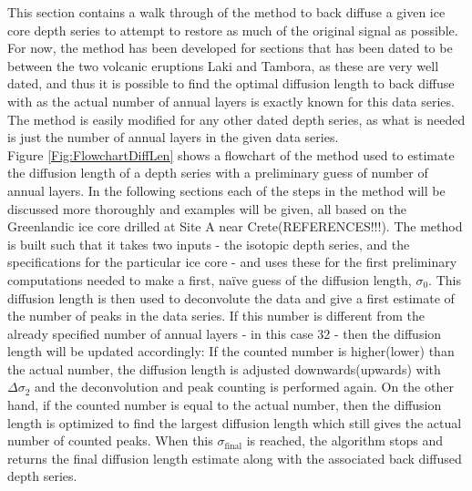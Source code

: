 \documentclass[../../CompleteThesis/Complete_1stDraft.tex]{subfiles}
\begin{document}
This section contains a walk through of the method to back diffuse a given ice core depth series to attempt to restore as much of the original signal as possible. For now, the method has been developed for sections that has been dated to be between the two volcanic eruptions Laki and Tambora, as these are very well dated, and thus it is possible to find the optimal diffusion length to back diffuse with as the actual number of annual layers is exactly known for this data series. The method is easily modified for any other dated depth series, as what is needed is just the number of annual layers in the given data series.\\
Figure \ref{Fig:FlowchartDiffLen} shows a flowchart of the method used to estimate the diffusion length of a depth series with a preliminary guess of number of annual layers. In the following sections each of the steps in the method will be discussed more thoroughly and examples will be given, all based on the Greenlandic ice core drilled at Site A near Crete(REFERENCES!!!).
The method is built such that it takes two inputs - the isotopic depth series, and the specifications for the particular ice core - and uses these for the first preliminary computations needed to make a first, naïve guess of the diffusion length, $\sigma_0$.
This diffusion length is then used to deconvolute the data and give a first estimate of the number of peaks in the data series. If this number is different from the already specified number of annual layers - in this case 32 - then the diffusion length will be updated accordingly: If the counted number is higher(lower) than the actual number, the diffusion length is adjusted downwards(upwards) with $\Delta\sigma_2$ and the deconvolution and peak counting is performed again.
On the other hand, if the counted number is equal to the actual number, then the diffusion length is optimized to find the largest diffusion length which still gives the actual number of counted peaks. When this $\sigma_{\text{final}}$ is reached, the algorithm stops and returns the final diffusion length estimate along with the associated back diffused depth series.
\end{document}
